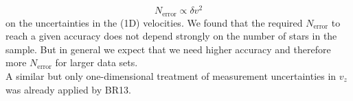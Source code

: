 \begin{equation*}
N_\text{error} \propto \delta v^2
\end{equation*}
on the uncertainties in the (1D) velocities. We found that the required $N_\text{error}$ to reach a given accuracy does not depend strongly on the number of stars in the sample. But in general we expect that we need higher accuracy and therefore more $N_\text{error}$ for larger data sets.
\\A similar but only one-dimensional treatment of measurement uncertainties in $v_z$ was already applied by BR13.

